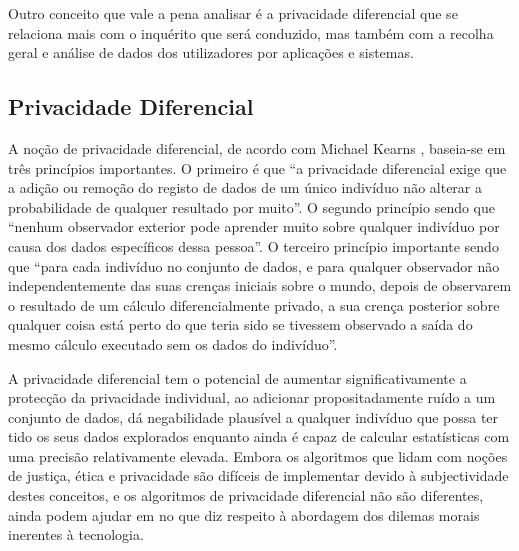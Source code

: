 \documentclass[conference]{IEEEtran}
\begin{document}
Outro conceito que vale a pena analisar é a privacidade diferencial que
se relaciona mais com o inquérito que será conduzido, mas também com a recolha
geral e análise de dados dos utilizadores por aplicações e sistemas.


\subsection{Privacidade Diferencial}

A noção de privacidade diferencial, de acordo com Michael Kearns \cite{kearns2019ethical},
baseia-se em três princípios importantes. O primeiro é que ``a privacidade
diferencial exige que a adição ou remoção do registo de dados de um único
indivíduo não alterar a probabilidade de qualquer resultado por muito''. O
segundo princípio sendo que ``nenhum observador exterior pode aprender muito
sobre qualquer indivíduo por causa dos dados específicos dessa pessoa''. O
terceiro princípio importante sendo que ``para cada indivíduo no conjunto de
dados, e para qualquer observador não independentemente das suas crenças iniciais
sobre o mundo, depois de observarem o resultado de um cálculo diferencialmente
privado, a sua crença posterior sobre qualquer coisa está perto do que teria
sido se tivessem observado a saída do mesmo cálculo executado sem os dados do
indivíduo''.


A privacidade diferencial tem o potencial de aumentar significativamente a
protecção da privacidade individual, ao adicionar propositadamente
ruído a um conjunto de dados, dá negabilidade plausível a qualquer indivíduo
que possa ter tido os seus dados explorados enquanto ainda é capaz de calcular
estatísticas com uma precisão relativamente elevada. Embora os algoritmos que
lidam com noções de justiça, ética e privacidade são difíceis de implementar
devido à subjectividade destes conceitos, e os algoritmos de privacidade diferencial
não são diferentes, ainda podem ajudar em no que diz respeito à abordagem dos
dilemas morais inerentes à tecnologia.
\end{document}
